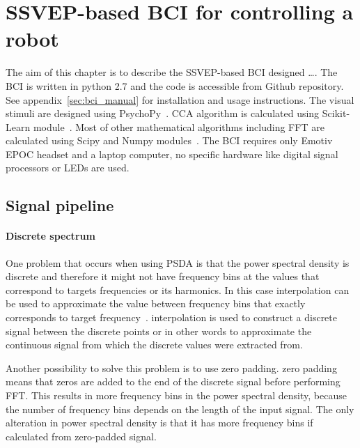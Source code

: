 
\chapter{SSVEP-based BCI for controlling a robot}
\label{sec:SSVEP_BCI}

The aim of this chapter is to describe the \gls{SSVEP}-based \gls{BCI} designed \dots. The \gls{BCI} is written in python 2.7 and the code is accessible from Github repository. See appendix~\ref{sec:bci_manual} for installation and usage instructions. The visual stimuli are designed using PsychoPy~\cite{psychopy}. \gls{CCA} algorithm is calculated using Scikit-Learn module~\cite{scikit-learn}. Most of other mathematical algorithms including \gls{FFT} are calculated using Scipy and Numpy modules~\cite{scipy}. The \gls{BCI} requires only Emotiv EPOC headset and a laptop computer, no specific hardware like digital signal processors or \glspl{LED} are used.

\section{Signal pipeline}
\label{sec:signal_pipeline}

\subsubsection{Discrete spectrum}

One problem that occurs when using \gls{PSDA} is that the \gls{power spectral density} is discrete and therefore it might not have frequency bins at the values that correspond to \glspl{target} frequencies or its \glspl{harmonic}. In this case \gls{interpolation} can be used to approximate the value between frequency bins that exactly corresponds to \gls{target} frequency~\cite{cca_psda}. \Gls{interpolation} is used to construct a discrete signal between the discrete points or in other words to approximate the continuous signal from which the discrete values were extracted from.

Another possibility to solve this problem is to use \gls{zero padding}. \Gls{zero padding} means that zeros are added to the end of the discrete signal before performing \gls{FFT}. This results in more \glspl{frequency bin} in the \gls{power spectral density}, because the number of \glspl{frequency bin} depends on the length of the input signal. The only alteration in \gls{power spectral density} is that it has more \glspl{frequency bin} if calculated from zero-padded signal.

